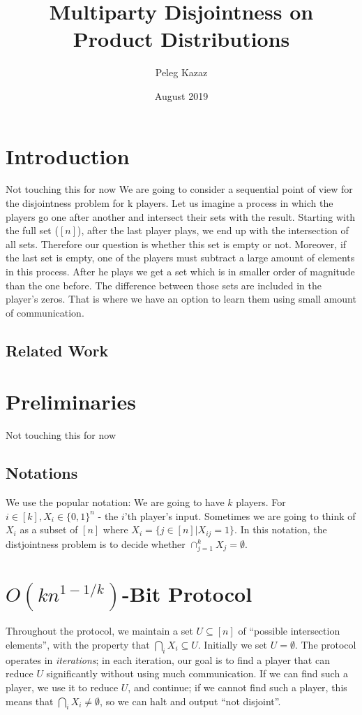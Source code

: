 \documentclass{article}
\title{Multiparty Disjointness on Product Distributions}
\author{Peleg Kazaz}
\date{August 2019}
\newcommand{\Rnote}[1]{ { \color{magenta} #1 } }
\theoremstyle{plain}
\begin{document}
\maketitle


\section{Introduction}
\Rnote{Not touching this for now}
We are going to consider a sequential point of view for the disjointness problem for k players. Let us imagine a process in which the players go one after another and intersect their sets with the result. Starting with the full set ($[n]$), after the last player plays, we end up with the intersection of all sets. Therefore our question is whether this set is empty or not. Moreover, if the last set is empty, one of the players must subtract a large amount of elements in this process. After he plays we get a set which is in smaller order of magnitude than the one before. The difference between those sets are included in the player's zeros. That is where we have an option to learn them using small amount of communication. 
\subsection{Related Work}
\section{Preliminaries}
\Rnote{Not touching this for now}
\subsection{Notations}
We use the popular notation: We are going to have $k$ players. For $i \in [k], X_i \in \{0,1\}^{n}$ - the $i$'th player's input. Sometimes we are going to think of $X_i$ as a subset of $[n]$ where $X_i = \{j \in [n] | X_{ij} = 1\}$. In this notation, the distjointness problem is to decide whether $\cap^{k}_{j=1}X_j = \emptyset$. \newline
\section{$O(kn^{1-1/k})$-Bit Protocol}
Throughout the protocol, we maintain a set $U \subseteq [n]$ of ``possible intersection elements'', with the property that $\bigcap_i X_i \subseteq U$.
Initially we set $U = \emptyset$.
The protocol operates in \emph{iterations};
in each iteration, our goal is to find a player that can reduce $U$ significantly without using much communication.
If we can find such a player, we use it to reduce $U$, and continue;
if we cannot find such a player, this means that $\bigcap_i X_i \neq \emptyset$, so we can halt and output ``not disjoint''.
\end{document}
